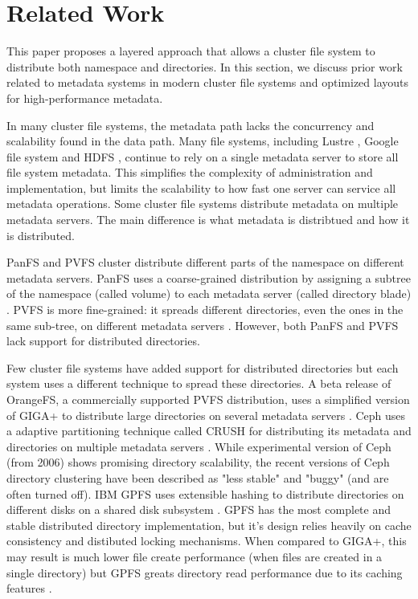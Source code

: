 \section{Related Work}
\label{relatedwork}

This paper proposes a layered approach that allows a cluster file system to 
distribute both namespace and directories. In this section, we discuss prior
work related to metadata systems in modern cluster file systems and optimized
layouts for high-performance metadata.

In many cluster file systems, the metadata path lacks the concurrency and 
scalability found in the data path.
Many file systems, including Lustre \cite{lustre}, Google file system
\cite{gfs:ghemawat03} and HDFS \cite{HDFS}, continue to rely on a single
metadata server to store all file system metadata. This simplifies the
complexity of administration and implementation, but limits the scalability to 
how fast one server can service all metadata operations. 
Some cluster file systems distribute metadata on multiple metadata servers. The 
main difference is what metadata is distribtued and how it is distributed.

PanFS and PVFS cluster distribute different parts of the namespace on different
metadata servers.
PanFS uses a coarse-grained distribution by assigning a subtree of the
namespace (called volume) to each metadata server (called directory blade) 
\cite{panfs:welch08}.
PVFS is more fine-grained: it spreads different directories, even the ones in
the same sub-tree, on different metadata servers \cite{pvfs}.
However, both PanFS and PVFS lack support for distributed directories.

Few cluster file systems have added support for distributed directories but
each system uses a different technique to spread these directories.
A beta release of OrangeFS, a commercially supported PVFS distribution, uses a 
simplified version of GIGA+ to distribute large directories on several metadata 
servers \cite{OrangeFS}.
Ceph uses a adaptive partitioning technique called CRUSH for distributing its
metadata and directories on multiple metadata servers \cite{ceph:weil06}. While
experimental version of Ceph (from 2006) shows promising directory scalability,
the recent versions of Ceph directory clustering have been described as
"less stable" \cite{ceph-baddirs1:www} and "buggy" \cite{ceph-baddirs2:www}
(and are often turned off).
IBM GPFS uses extensible hashing to distribute directories on different disks on 
a shared disk subsystem \cite{gpfs:schmuck02}. GPFS has the most complete and
stable distributed directory implementation, but it's design relies heavily on
cache consistency and distibuted locking mechanisms. When compared to GIGA+,
this may result is much lower file create performance (when files are created
in a single directory) but GPFS greats directory read performance due to its
caching features \cite{GIGA11}.

